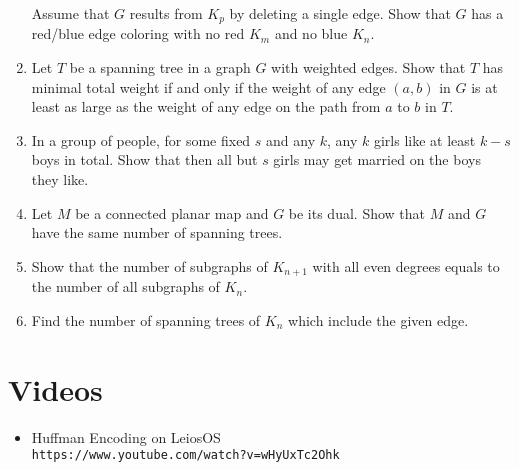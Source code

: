 \begin{enumerate}
Assume that $G$ results from $K_p$ by deleting a single edge.
Show that $G$ has a red/blue edge coloring with no red
$K_m$ and no blue $K_n$.
\item Let $T$ be a spanning tree in a graph $G$ with weighted edges.
Show that $T$ has minimal total weight if and only if the weight of any edge $(a,b)$ in $G$ is at least as large as the weight of any edge on the path from $a$ to $b$ in $T$.
\item In a group of people, for some fixed $s$ and any $k$,
any $k$ girls like at least $k-s$ boys in total.
Show that then all but $s$ girls may get married on the boys they like.
\item Let $M$ be a connected planar map and $G$ be its dual.
Show that $M$ and $G$ have the same number of spanning trees.
\item Show that the number of subgraphs of $K_{n+1}$ with all even degrees equals to the number of all subgraphs of $K_n$.

\item Find the number of spanning trees of $K_n$ which include the given edge.

\end{enumerate}

\chapter{Videos}

\begin{itemize}
 \item Huffman Encoding on LeiosOS\\ \texttt{https://www.youtube.com/watch?v=wHyUxTc2Ohk}
\end{itemize}
